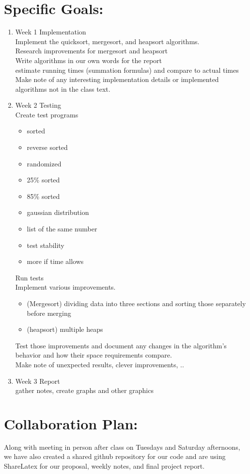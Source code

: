 \documentclass{article}
\begin{document}
\section*{Specific Goals:} 
\begin{enumerate}
\item Week 1  Implementation\\
Implement the quicksort, mergesort, and heapsort algorithms.\\
Research improvements for mergesort and heapsort\\
Write algorithms in our own words for the report\\
estimate running times (summation formulas) and compare to actual times\\
Make note of any interesting implementation details or implemented algorithms not in the class text.
\item Week 2  Testing \\
Create test programs
\begin{itemize}
\item sorted
\item reverse sorted
\item randomized
\item 25\% sorted
\item 85\% sorted
\item gaussian distribution
\item list of the same number
\item test stability
\item more if time allows
\end{itemize}
Run tests\\
Implement various improvements.\\
\begin{itemize}
\item (Mergesort) dividing data into three sections and sorting those separately before merging
\item (heapsort) multiple heaps
\end{itemize}
Test those improvements and document any changes in the algorithm's behavior and how their space requirements compare.\\
Make note of unexpected results, clever improvements, .. 
\item Week 3  Report \\
gather notes, create graphs and other graphics\\
\end{enumerate}
\section*{Collaboration Plan: }
Along with meeting in person after class on Tuesdays and Saturday afternoons, we have also created a shared github repository for our code and are using ShareLatex for our proposal, weekly notes, and final project report.\\
\end{document}
